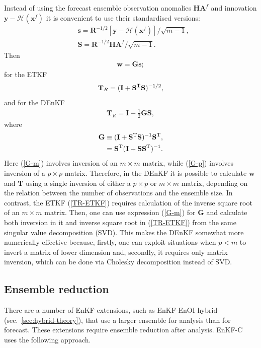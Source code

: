 \documentclass[11pt]{report}
\newcommand{\mb} {\mathbf}
\newcommand{\T}{^{\tiny \mathrm T}}
\begin{document}
Instead of using the forecast ensemble observation anomalies $\mb H \mb A^f$ and innovation $\mb y - \mathcal H(\mb x^f)$ it is convenient to use their standardised versions:
\begin{align}
  \label{s}
  &\mb s = \mb R^{-1/2} \left[ \mb y - \mathcal H(\mb x^f) \right] / \sqrt{m - 1},\\
  \label{S}
  &\mb S = \mb R^{-1/2} \mb H \mb A^f / \sqrt{m - 1}.
\end{align}
Then
\begin{align}
  \mb w = \mb G \mb s;
\end{align}
for the ETKF
\begin{align}
  \label{TR-ETKF}
  \mb T_R = (\mb I + \mb S\T \mb S)^{-1/2},
\end{align}
and for the DEnKF
\begin{align}
  \label{TR-DEnKF}
  \mb T_R = \mb I - \frac{1}{2} \mb G \mb S,
\end{align}
where
\begin{align}
  \label{G-m}
  \mb G &\equiv (\mb I + \mb S\T \mb S)^{-1} \mb S\T,\\
  \label{G-p}
  & = \mb S\T ( \mb I + \mb S \mb S\T)^{-1}.
\end{align}
Here (\ref{G-m}) involves inversion of an $m \times m$ matrix, while (\ref{G-p}) involves inversion of a $p \times p$ matrix.
Therefore, in the DEnKF it is possible to calculate $\mb w$ and $\mb T$ using a single inversion of either a $p \times p$ or $m \times m$ matrix, depending on the relation between the number of observations and the ensemble size.
In contrast, the ETKF (\ref{TR-ETKF}) requires calculation of the inverse square root of an $m \times m$ matrix.
Then, one can use expression (\ref{G-m}) for $\mb G$ and calculate both inversion in it and inverse square root in (\ref{TR-ETKF}) from the same singular value decomposition (SVD).
This makes the DEnKF somewhat more numerically effective because, firstly, one can exploit situations when $p < m$ to invert a matrix of lower dimension and, secondly, it requires only matrix inversion, which can be done via Cholesky decomposition instead of SVD.

\subsection{Ensemble reduction}
\label{sec:reduction}

There are a number of EnKF extensions, such as EnKF-EnOI hybrid (sec.~\ref{sec:hybrid-theory}), that use a larger ensemble for analysis than for forecast.
These extensions require ensemble reduction after analysis.
EnKF-C uses the following approach.
\end{document}

